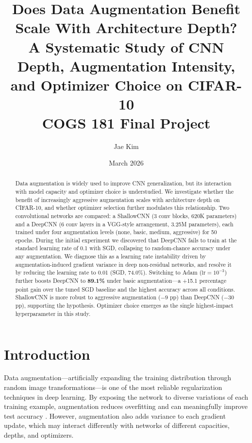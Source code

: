 \documentclass[11pt,letterpaper]{article}
\title{%
  \textbf{Does Data Augmentation Benefit Scale With Architecture Depth?}\\[0.5em]
  \large A Systematic Study of CNN Depth, Augmentation Intensity,\\
  and Optimizer Choice on CIFAR-10\\[1em]
  \normalsize COGS 181 Final Project
}
\author{Jae Kim}
\date{March 2026}
\begin{document}
\maketitle
\thispagestyle{empty}

\begin{abstract}
Data augmentation is widely used to improve CNN generalization, but its interaction with model
capacity and optimizer choice is understudied. We investigate whether the benefit of increasingly
aggressive augmentation scales with architecture depth on CIFAR-10, and whether optimizer
selection further modulates this relationship. Two convolutional networks are compared: a
ShallowCNN (3 conv blocks, 620K parameters) and a DeepCNN (6 conv layers in a VGG-style
arrangement, 3.25M parameters), each trained under four augmentation levels (none, basic,
medium, aggressive) for 50 epochs. During the initial experiment we discovered that DeepCNN
fails to train at the standard learning rate of 0.1 with SGD, collapsing to random-chance
accuracy under any augmentation. We diagnose this as a learning rate instability driven by
augmentation-induced gradient variance in deep non-residual networks, and resolve it by
reducing the learning rate to 0.01 (SGD, 74.0\%). Switching to Adam ($\mathrm{lr}=10^{-3}$)
further boosts DeepCNN to \textbf{89.1\%} under basic augmentation---a +15.1 percentage point
gain over the tuned SGD baseline and the highest accuracy across all conditions. ShallowCNN is
more robust to aggressive augmentation ($-9$ pp) than DeepCNN ($-30$ pp), supporting
the hypothesis. Optimizer choice emerges as the single highest-impact hyperparameter in this study.
\end{abstract}


\section{Introduction}

Data augmentation---artificially expanding the training distribution through random image
transformations---is one of the most reliable regularization techniques in deep learning.
By exposing the network to diverse variations of each training example, augmentation reduces
overfitting and can meaningfully improve test accuracy \cite{shorten2019survey}. However,
augmentation also adds variance to each gradient update, which may interact differently with
networks of different capacities, depths, and optimizers.
\end{document}
